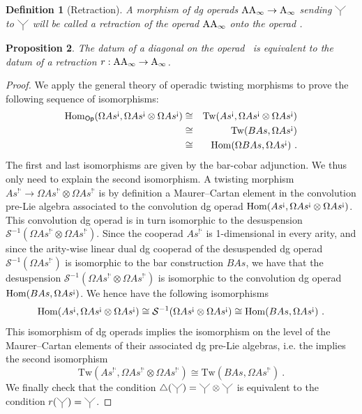 \documentclass[twoside, 11pt]{amsart}
\newtheorem{definition}{Definition}[section]
\newtheorem{proposition}[definition]{Proposition}
\theoremstyle{remark}
\begin{document}
\begin{definition}[Retraction]
A morphism of dg operads $\mathrm{AA}_\infty \rightarrow \mathrm{A}_\infty$ sending $\premiertermecobarbarA$ to $\premiertermecobarbarA$ will be called a \emph{retraction of the operad $\mathrm{AA}_\infty$ onto the operad \Ainf }.
\end{definition}

\begin{proposition}\label{prop:retract}
The datum of a diagonal on the operad \Ainf\ is equivalent to the datum of a retraction $r : \mathrm{AA}_\infty \rightarrow \mathrm{A}_\infty$.
\end{proposition}

\begin{proof}
We apply the general theory of operadic twisting morphisms \cite[Section 6.4]{LodayVallette12} to prove the following sequence of isomorphisms: 
\begin{eqnarray*}
  \mathrm{Hom}_{\mathsf{Op}} (\Omega As^{\text{!`}}, \Omega As^{\text{!`}} \otimes \Omega As^{\text{!`}}) & \cong & \mathrm{Tw}(As^{\text{!`}}, \Omega As^{\text{!`}} \otimes \Omega As^{\text{!`}}) \\
  & \cong & \mathrm{Tw}(B As,\Omega As^{\text{!`}}) \\
  & \cong & \mathrm{Hom} (\Omega B As, \Omega As^{\text{!`}}) \ . 
\end{eqnarray*}
The first and last isomorphisms are given by the bar-cobar adjunction. We thus only need to explain the second isomorphism. 
A twisting morphism $As^{\text{!`}}\to \Omega As^{\text{!`}} \otimes \Omega As^{\text{!`}}$ is by definition a Maurer--Cartan element in the convolution pre-Lie algebra associated to the convolution dg operad $\mathrm{Hom} (As^{\text{!`}}, \Omega As^{\text{!`}} \otimes \Omega As^{\text{!`}})$.
This convolution dg operad is in turn isomorphic to the desuspension $\mathcal{S}^{-1}(\Omega As^{\text{!`}} \otimes \Omega As^{\text{!`}})$.
Since the cooperad $As^{\text{!`}}$ is 1-dimensional in every arity, and since the arity-wise linear dual dg cooperad of the desuspended dg operad $\mathcal{S}^{-1}(\Omega As^{\text{!`}})$ is isomorphic to the bar construction $B As$, we have that 
the desuspension $\mathcal{S}^{-1}(\Omega As^{\text{!`}} \otimes \Omega As^{\text{!`}})$ is isomorphic to the convolution dg operad $\mathrm{Hom} (B As, \Omega As^{\text{!`}})$. We hence have the following isomorphisms
\[ \mathrm{Hom} (As^{\text{!`}}, \Omega As^{\text{!`}} \otimes \Omega As^{\text{!`}}) \cong \mathcal{S}^{-1}(\Omega As^{\text{!`}} \otimes \Omega As^{\text{!`}}) \cong \mathrm{Hom} (B As, \Omega As^{\text{!`}}) \ . \]
This isomorphism of dg operads implies the isomorphism on the level of the Maurer--Cartan elements of their associated dg pre-Lie algebras, i.e. the implies the second isomorphism
\[ \mathrm{Tw}(As^{\text{!`}}, \Omega As^{\text{!`}} \otimes \Omega As^{\text{!`}}) \cong \mathrm{Tw}(B As,\Omega As^{\text{!`}}) \ . \]
We finally check that the condition $\triangle (\premiertermecobarbarA) = \premiertermecobarbarA \otimes \premiertermecobarbarA$ is equivalent to the condition $r(\premiertermecobarbarA)=\premiertermecobarbarA$.
\end{proof}
\end{document}
